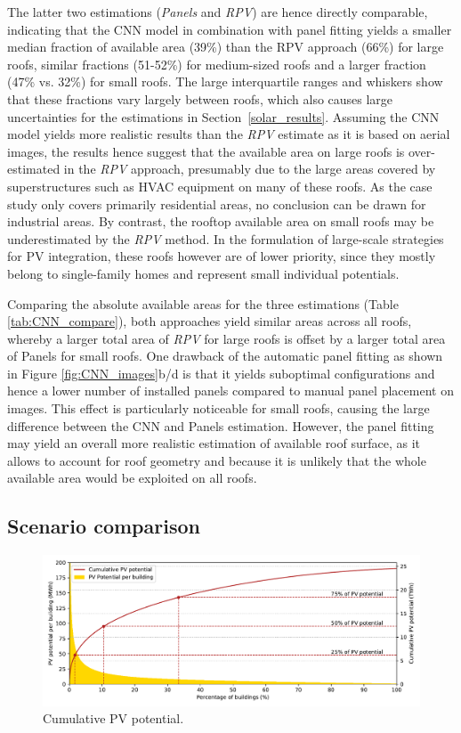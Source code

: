 The latter two estimations (\textit{Panels} and \textit{RPV}) are hence directly comparable, indicating that the CNN model in combination with panel fitting yields a smaller median fraction of available area (39\%) than the RPV approach (66\%) for large roofs, similar fractions (51-52\%) for medium-sized roofs and a larger fraction (47\% vs. 32\%) for small roofs. The large interquartile ranges and whiskers show that these fractions vary largely between roofs, which also causes large uncertainties for the estimations in Section~\ref{solar_results}. Assuming the CNN model yields more realistic results than the \textit{RPV} estimate as it is based on aerial images, the results hence suggest that the available area on large roofs is over-estimated in the \textit{RPV} approach, presumably due to the large areas covered by superstructures such as HVAC equipment on many of these roofs. As the case study only covers primarily residential areas, no conclusion can be drawn for industrial areas. By contrast, the rooftop available area on small roofs may be underestimated by the \textit{RPV} method. In the formulation of large-scale strategies for PV integration, these roofs however are of lower priority, since they mostly belong to single-family homes and represent small individual potentials. 

Comparing the absolute available areas for the three estimations (Table \ref{tab:CNN_compare}), both approaches yield similar areas across all roofs, whereby a larger total area of \textit{RPV} for large roofs is offset by a larger total area of Panels for small roofs. One drawback of the automatic panel fitting as shown in Figure \ref{fig:CNN_images}b/d is that it yields suboptimal configurations and hence a lower number of installed panels compared to manual panel placement on images. This effect is particularly noticeable for small roofs, causing the large difference between the CNN and Panels estimation. However, the panel fitting may yield an overall more realistic estimation of available roof surface, as it allows to account for roof geometry and because it is unlikely that the whole available area would be exploited on all roofs.  


\subsection{Scenario comparison}

\begin{figure}[tb]
\centering
\includegraphics[width=\linewidth]{images/Figs/Cumulative_PV_potential.pdf}
\caption{Cumulative PV potential.}
\label{fig:PV_cumulative}
\end{figure}



